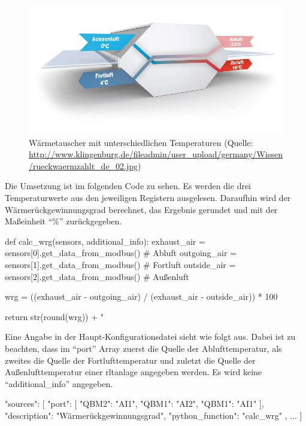 \begin{figure}[H]
	\centering
	\includegraphics[width=0.7\linewidth]{Bilder/rueckwaermzahl_waermetauscher}
	\caption{Wärmetauscher mit unterschiedlichen Temperaturen (Quelle: \url{http://www.klingenburg.de/fileadmin/user_upload/germany/Wissen/rueckwaermzahlt_de_02.jpg})}
	\label{fig:waermetauscher_wrg}
\end{figure}
 
Die Umsetzung ist im folgenden Code zu sehen. Es werden die drei Temperaturwerte aus den jeweiligen Registern ausgelesen. Daraufhin wird der Wärmerückgewinnungsgrad berechnet, das Ergebnis gerundet und mit der Maßeinheit \enquote{\%} zurückgegeben.

\begin{pythoncode}
def calc_wrg(sensors, additional_info):
	exhaust_air = sensors[0].get_data_from_modbus()  # Abluft
	outgoing_air = sensors[1].get_data_from_modbus()  # Fortluft
	outside_air = sensors[2].get_data_from_modbus()  # Außenluft
	
	wrg = ((exhaust_air - outgoing_air) / (exhaust_air - outside_air)) * 100
	
	return str(round(wrg)) + " %
\end{pythoncode}

Eine Angabe in der Haupt-Konfigurationsdatei sieht wie folgt aus. Dabei ist zu beachten, dass im \enquote{port} Array zuerst die Quelle der Ablufttemperatur, als zweites die Quelle der Fortlufttemperatur und zuletzt die Quelle der Außenlufttemperatur einer \acs{rltanlage} angegeben werden. Es wird keine \enquote{additional\_info} angegeben.

\begin{jsoncode}
	"sources": [
	{
		"port": [
			{"QBM2": "AI1"},
			{"QBM1": "AI2"},
			{"QBM1": "AI1"}
		],
		"description": "Wärmerückgewinnungsgrad",
		"python_function": "calc_wrg"
	},
	...
	]
\end{jsoncode}



